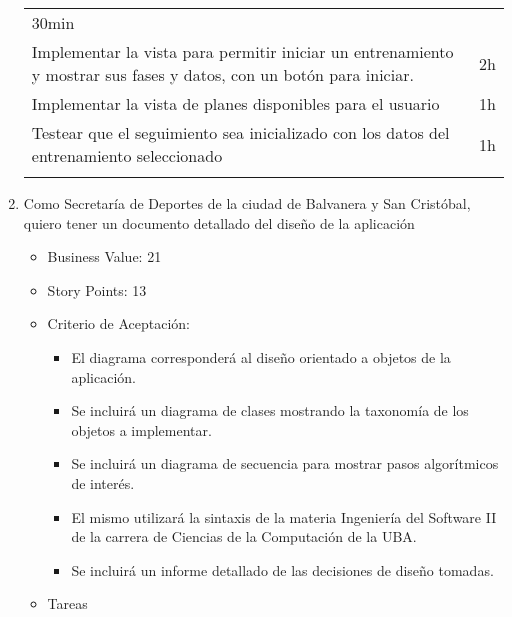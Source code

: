 \begin{enumerate}
\begin{longtable}[c]{@{}ll@{}}
\begin{minipage}[t]{0.08\columnwidth}
  30min
  \end{minipage}
  \\\noalign{\medskip}
  \begin{minipage}[t]{0.92\columnwidth}\raggedright
  Implementar la vista para permitir iniciar un entrenamiento y mostrar
  sus fases y datos, con un botón para iniciar.
  \end{minipage} & \begin{minipage}[t]{0.08\columnwidth}\raggedright
  2h
  \end{minipage}
  \\\noalign{\medskip}
  \begin{minipage}[t]{0.92\columnwidth}\raggedright
  Implementar la vista de planes disponibles para el usuario
  \end{minipage} & \begin{minipage}[t]{0.08\columnwidth}\raggedright
  1h
  \end{minipage}
  \\\noalign{\medskip}
  \begin{minipage}[t]{0.92\columnwidth}\raggedright
  Testear que el seguimiento sea inicializado con los datos del
  entrenamiento seleccionado
  \end{minipage} & \begin{minipage}[t]{0.08\columnwidth}\raggedright
  1h
  \end{minipage}
  \\\noalign{\medskip}
  \hline
  \end{longtable}
\item
  Como Secretaría de Deportes de la ciudad de Balvanera y San Cristóbal,
  quiero tener un documento detallado del diseño de la aplicación

  \begin{itemize}
  \itemsep1pt\parskip0pt
  \item
    Business Value: 21
  \item
    Story Points: 13
  \item
    Criterio de Aceptación:

    \begin{itemize}
    \itemsep1pt\parskip0pt
    \item
      El diagrama corresponderá al diseño orientado a objetos de la
      aplicación.
    \item
      Se incluirá un diagrama de clases mostrando la taxonomía de los
      objetos a implementar.
    \item
      Se incluirá un diagrama de secuencia para mostrar pasos
      algorítmicos de interés.
    \item
      El mismo utilizará la sintaxis de la materia Ingeniería del
      Software II de la carrera de Ciencias de la Computación de la UBA.
    \item
      Se incluirá un informe detallado de las decisiones de diseño
      tomadas.
    \end{itemize}
  \item
    Tareas
  \end{itemize}


\end{enumerate}
